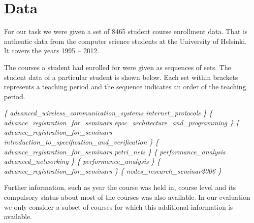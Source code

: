 \section{Data}


For our task we were given a set of 8465 student course enrollment data. 
That is authentic data from the computer science students at the University of Helsinki. 
It covers the years 1995 – 2012.

The courses a student had enrolled for were given as sequences of sets. 
The student data of a particular student is shown below. 
Each set within { } brackets represents a teaching period and the sequence indicates an order of the teaching period.

\textit{
\{ advanced\_wireless\_communication\_systems internet\_protocols \}
\{ advance\_registration\_for\_seminars epoc\_architecture\_and\_programming \}
\{ advance\_registration\_for\_seminars introduction\_to\_specification\_and\_verification \}
\{ advance\_registration\_for\_seminars petri\_nets \}
\{ performance\_analysis advanced\_networking \}
\{ performance\_analysis \}
\{ advance\_registration\_for\_seminars \}
\{ nodes\_research\_seminar2006 \}
}


Further information, such as year the course was held in,  course level and its compulsory status about most of the courses was also available. In our evaluation we only consider a subset of courses for which this additional information is available.
